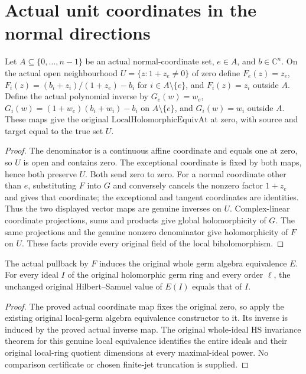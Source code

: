 \section{Actual unit coordinates in the normal directions}

\begin{definition}
\label{hir:actual-normal-unit-local-biholomorphism}
Let $A\subseteq\{0,\ldots,n-1\}$ be an actual normal-coordinate set,
$e\in A$, and $b\in\mathbb C^n$. On the actual open neighbourhood
$U=\{z:1+z_e\ne0\}$ of zero define $F_e(z)=z_e$,
$F_i(z)=(b_i+z_i)/(1+z_e)-b_i$ for $i\in A\setminus\{e\}$,
and $F_i(z)=z_i$ outside $A$. Define the actual polynomial inverse by
$G_e(w)=w_e$, $G_i(w)=(1+w_e)(b_i+w_i)-b_i$ on
$A\setminus\{e\}$, and $G_i(w)=w_i$ outside $A$.
These maps give the original $\mathrm{LocalHolomorphicEquivAt}$ at zero,
with source and target equal to the true set $U$.
\leanok
\end{definition}
\begin{proof}
The denominator is a continuous affine coordinate and equals one at
zero, so $U$ is open and contains zero. The exceptional coordinate is
fixed by both maps, hence both preserve $U$. Both send zero to zero.
For a normal coordinate other than $e$, substituting $F$ into $G$
and conversely cancels the nonzero factor $1+z_e$ and gives that
coordinate; the exceptional and tangent coordinates are identities.
Thus the two displayed vector maps are genuine inverses on $U$.
Complex-linear coordinate projections, sums and products give global
holomorphicity of $G$. The same projections and the genuine nonzero
denominator give holomorphicity of $F$ on $U$. These facts provide
every original field of the local biholomorphism.
\end{proof}

\begin{theorem}
\label{hir:actual-normal-unit-whole-germ-hs}
The actual pullback by $F$ induces the original whole germ algebra
equivalence $E$. For every ideal $I$ of the original holomorphic germ
ring and every order $\ell$, the unchanged original Hilbert--Samuel
value of $E(I)$ equals that of $I$.
\leanok
\end{theorem}
\begin{proof}
The proved actual coordinate map fixes the original zero, so apply the
existing original local-germ algebra equivalence constructor to it.
Its inverse is induced by the proved actual inverse map. The original
whole-ideal HS invariance theorem for this genuine local equivalence
identifies the entire ideals and their original local-ring quotient
dimensions at every maximal-ideal power. No comparison certificate or
chosen finite-jet truncation is supplied.
\end{proof}

